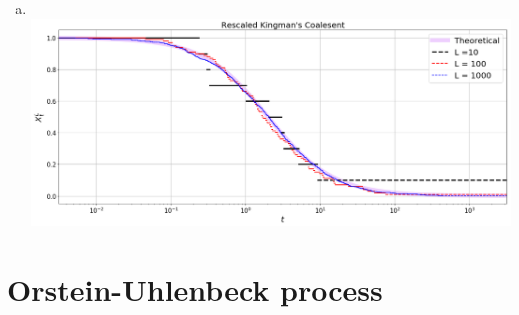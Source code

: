 \documentclass[12pt, twoside, a4paper]{article}
\begin{document}
\begin{enumerate}[a)]
\item
\text{}\\
\hspace*{-2cm}
\includegraphics[width=19cm]{Kingman}
\end{enumerate}

\section{Orstein-Uhlenbeck process}
\end{document}
